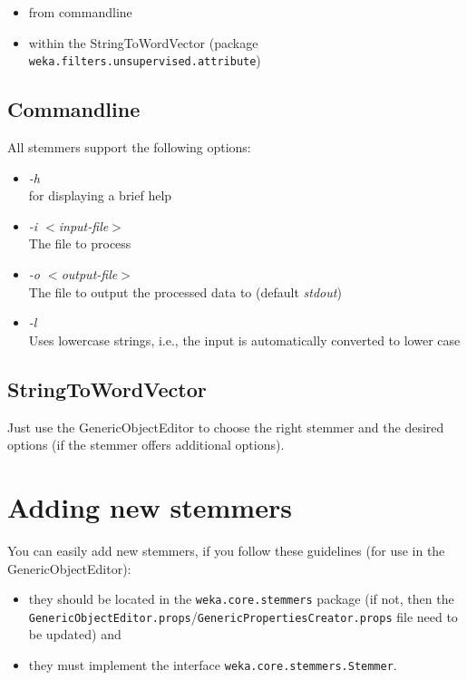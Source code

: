 \begin{itemize}
	\item from commandline
	\item within the StringToWordVector (package \texttt{weka.filters.unsupervised.attribute})
\end{itemize}

\subsection{Commandline}
All stemmers support the following options:

\begin{itemize}
	\item \textit{-h} \\
		for displaying a brief help
	\item \textit{-i $<$input-file$>$} \\
		The file to process
	\item \textit{-o $<$output-file$>$} \\
		The file to output the processed data to (default \textit{stdout})
	\item \textit{-l} \\
		Uses lowercase strings, i.e., the input is automatically converted to lower case
\end{itemize}

\subsection{StringToWordVector}
Just use the GenericObjectEditor to choose the right stemmer and the desired options (if the stemmer offers additional options).

\section{Adding new stemmers}
You can easily add new stemmers, if you follow these guidelines (for use in the GenericObjectEditor):

\begin{itemize}
	\item they should be located in the \texttt{weka.core.stemmers} package (if not, then the \texttt{GenericObjectEditor.props}/\texttt{GenericPropertiesCreator.props} file need to be updated) and
	\item they must implement the interface \texttt{weka.core.stemmers.Stemmer}.
\end{itemize}
